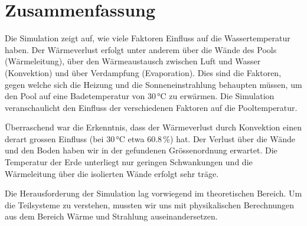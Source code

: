 \section{Zusammenfassung}
\label{sec:Zusammenfassung}
Die Simulation zeigt auf, wie viele Faktoren Einfluss auf die Wassertemperatur haben. Der Wärmeverlust erfolgt unter anderem über die Wände des Pools (Wärmeleitung), über den Wärmeaustausch zwischen Luft und Wasser (Konvektion) und über Verdampfung (Evaporation). Dies sind die Faktoren, gegen welche sich die Heizung und die Sonneneinstrahlung behaupten müssen, um den Pool auf eine Badetemperatur von 30\,°C zu erwärmen. Die Simulation veranschaulicht den Einfluss der verschiedenen Faktoren auf die Pooltemperatur.

Überraschend war die Erkenntnis, dass der Wärmeverlust durch Konvektion einen derart grossen Einfluss (bei 30\,°C etwa 60.8\,\%) hat. Der Verlust über die Wände und den Boden haben wir in der gefundenen Grössenordnung erwartet. Die Temperatur der Erde unterliegt nur geringen Schwankungen und die Wärmeleitung über die isolierten Wände erfolgt sehr träge.

Die Herausforderung der Simulation lag vorwiegend im theoretischen Bereich. Um die Teilsysteme zu verstehen, mussten wir uns mit physikalischen Berechnungen aus dem Bereich Wärme und Strahlung auseinandersetzen.
